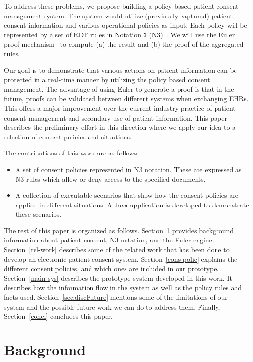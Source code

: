 \documentclass[conference]{IEEEtran}
\begin{document}
To address these problems, we propose building a policy based patient consent management system. The system would utilize (previously captured) patient consent
information and various operational policies as input. Each policy will be represented by a set of RDF rules in Notation 3 (N3)~\cite{N3not}.  We will use the
Euler proof mechanism~\cite{eurlorprf} to compute (a) the result and (b) the proof of the aggregated rules.  


Our goal is to demonstrate that various actions on patient information can be protected in a real-time manner by utilizing the policy based consent management.
The advantage of using Euler to generate a proof is that in the future, proofs can be validated between different systems when exchanging EHRs. This offers a
major improvement over the current industry practice of patient consent management and secondary use of patient information. This paper describes the
preliminary effort in this direction where we apply our idea to a selection of consent policies and situations.


The contributions of this work are as follows: 

\begin{itemize}
    \item A set of consent policies represented in N3 notation. These are expressed as N3 rules which allow or deny access to the specified documents.

\item A collection of executable scenarios that show how the consent policies are applied in different situations. A Java application is developed to
demonstrate these scenarios.
\end{itemize}

The rest of this paper is organized as follows. Section~\ref{bg-sec} provides background information about patient consent, N3 notation, and the Euler engine.
Section~\ref{rel-work} describes some of the related work that has been done to develop an electronic patient consent system. Section~\ref{cons-polic} explains
the different consent policies, and which ones are included in our prototype. Section~\ref{main-sys} describes the prototype system developed in this
work. It describes how the information flow in the system as well as the policy rules and facts used. Section~\ref{sec:discFuture} mentions some of the
limitations of our system and the possible future work we can do to address them. Finally, Section~\ref{concl} concludes this paper.


\section{Background}
\label{bg-sec}
\end{document}
